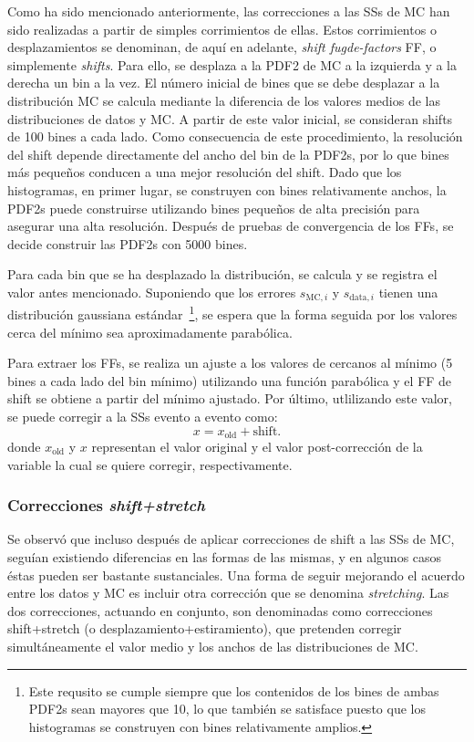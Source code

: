 Como ha sido mencionado anteriormente, las correcciones a las \acp{SS} de \ac{MC} han sido realizadas a partir de simples corrimientos de ellas. Estos corrimientos o desplazamientos se denominan, de aqu\'i en adelante, \textit{shift fugde-factors} \ac{FF}, o simplemente \textit{shifts}.
Para ello, se desplaza a la \ac{PDF2} de \ac{MC} a la izquierda y a la derecha un bin a la vez.
El número inicial de bines que se debe desplazar a la distribución \ac{MC} se calcula mediante la diferencia de los valores medios de las distribuciones de datos y \ac{MC}. A partir de este valor inicial, se consideran shifts de 100 bines a cada lado.
Como consecuencia de este procedimiento, la resolución del shift depende directamente del ancho del bin de la \acp{PDF2}, por lo que bines m\'as pequeños conducen a una mejor resolución del shift. Dado que los histogramas, en primer lugar, se construyen con bines relativamente anchos, la \acp{PDF2} puede construirse utilizando bines pequeños de alta precisión para asegurar una alta resolución. Después de pruebas de convergencia de los \acp{FF}, se decide construir las \acp{PDF2} con 5000 bines.

Para cada bin que se ha desplazado la distribución, se calcula y se registra el valor \chisq antes mencionado. Suponiendo que los errores \(s_{\text{MC},i}\) y \(s_{\text{data},i}\) tienen una distribución gaussiana est\'andar~\footnote{Este requsito se cumple siempre que los contenidos de los bines de ambas \acp{PDF2} sean mayores que 10, lo que también se satisface puesto que los histogramas se construyen con bines relativamente amplios.}, se espera que la forma seguida por los valores \chisq cerca del m\'inimo sea aproximadamente parab\'olica.

Para extraer los \acp{FF}, se realiza un ajuste a los valores de \chisq cercanos al mínimo (5 bines a cada lado del bin mínimo) utilizando una función parabólica y el \ac{FF} de shift se obtiene a partir del mínimo ajustado. Por último, utlilizando este valor, se puede corregir a la \acp{SS} evento a evento como:
\[
	x = x_{\text{old}} + \text{shift}.
\]
donde \(x_{\text{old}}\) y \(x\) representan el valor original y el valor post-correcci\'on de la variable la cual se quiere corregir, respectivamente.


\subsubsection{Correcciones \textit{shift+stretch}}

Se observó que incluso después de aplicar correcciones de shift a las \acp{SS} de \ac{MC}, seguían existiendo diferencias en las formas de las mismas, y en algunos casos éstas pueden ser bastante sustanciales. Una forma de seguir mejorando el acuerdo entre los datos y \ac{MC} es incluir otra corrección que se denomina \textit{stretching}. Las dos correcciones, actuando en conjunto, son denominadas como correcciones shift+stretch (o desplazamiento+estiramiento), que pretenden corregir simultáneamente el valor medio y los anchos de las distribuciones de \ac{MC}.


